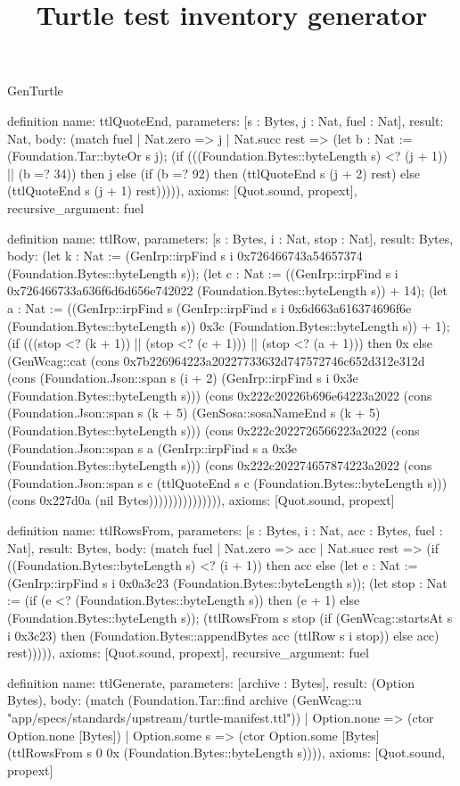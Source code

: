 \begin{lexlean}{GenTurtle}
\title{Turtle test inventory generator}
\begin{semanticmodule}
definition{
  name: ttlQuoteEnd,
  parameters: [s : Bytes, j : Nat, fuel : Nat],
  result: Nat,
  body: (match fuel
    | Nat.zero => j
    | Nat.succ rest => (let b : Nat := (Foundation.Tar::byteOr s j); (if (((Foundation.Bytes::byteLength s) <? (j + 1)) || (b =? 34)) then j else (if (b =? 92) then (ttlQuoteEnd s (j + 2) rest) else (ttlQuoteEnd s (j + 1) rest))))),
  axioms: [Quot.sound, propext],
  recursive_argument: fuel
}

definition{
  name: ttlRow,
  parameters: [s : Bytes, i : Nat, stop : Nat],
  result: Bytes,
  body: (let k : Nat := (GenIrp::irpFind s i 0x726466743a54657374 (Foundation.Bytes::byteLength s)); (let c : Nat := ((GenIrp::irpFind s i 0x726466733a636f6d6d656e742022 (Foundation.Bytes::byteLength s)) + 14); (let a : Nat := ((GenIrp::irpFind s (GenIrp::irpFind s i 0x6d663a616374696f6e (Foundation.Bytes::byteLength s)) 0x3c (Foundation.Bytes::byteLength s)) + 1); (if (((stop <? (k + 1)) || (stop <? (c + 1))) || (stop <? (a + 1))) then 0x else (GenWcag::cat (cons 0x7b226964223a20227733632d747572746c652d312e312d (cons (Foundation.Json::span s (i + 2) (GenIrp::irpFind s i 0x3e (Foundation.Bytes::byteLength s))) (cons 0x222c20226b696e64223a2022 (cons (Foundation.Json::span s (k + 5) (GenSosa::sosaNameEnd s (k + 5) (Foundation.Bytes::byteLength s))) (cons 0x222c2022726566223a2022 (cons (Foundation.Json::span s a (GenIrp::irpFind s a 0x3e (Foundation.Bytes::byteLength s))) (cons 0x222c202274657874223a2022 (cons (Foundation.Json::span s c (ttlQuoteEnd s c (Foundation.Bytes::byteLength s))) (cons 0x227d0a (nil Bytes))))))))))))))),
  axioms: [Quot.sound, propext]
}

definition{
  name: ttlRowsFrom,
  parameters: [s : Bytes, i : Nat, acc : Bytes, fuel : Nat],
  result: Bytes,
  body: (match fuel
    | Nat.zero => acc
    | Nat.succ rest => (if ((Foundation.Bytes::byteLength s) <? (i + 1)) then acc else (let e : Nat := (GenIrp::irpFind s i 0x0a3c23 (Foundation.Bytes::byteLength s)); (let stop : Nat := (if (e <? (Foundation.Bytes::byteLength s)) then (e + 1) else (Foundation.Bytes::byteLength s)); (ttlRowsFrom s stop (if (GenWcag::startsAt s i 0x3c23) then (Foundation.Bytes::appendBytes acc (ttlRow s i stop)) else acc) rest))))),
  axioms: [Quot.sound, propext],
  recursive_argument: fuel
}

definition{
  name: ttlGenerate,
  parameters: [archive : Bytes],
  result: (Option Bytes),
  body: (match (Foundation.Tar::find archive (GenWcag::u "app/specs/standards/upstream/turtle-manifest.ttl"))
    | Option.none => (ctor Option.none [Bytes])
    | Option.some s => (ctor Option.some [Bytes] (ttlRowsFrom s 0 0x (Foundation.Bytes::byteLength s)))),
  axioms: [Quot.sound, propext]
}
\end{semanticmodule}
\end{lexlean}
